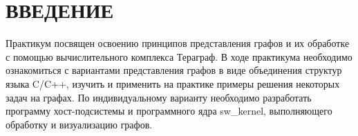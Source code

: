 \section*{ВВЕДЕНИЕ}

Практикум посвящен освоению принципов представления графов и их обработке с помощью вычислительного комплекса Тераграф. 
В ходе практикума необходимо ознакомиться с вариантами представления графов в виде объединения структур языка C/C++, изучить и применить на практике примеры решения некоторых задач на графах. 
По индивидуальному варианту необходимо разработать программу хост-подсистемы и программного ядра sw\_kernel, выполняющего обработку и визуализацию графов.

